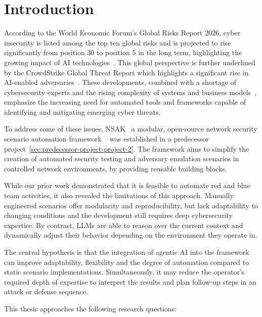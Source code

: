 
\chapter{Introduction}\label{ch:introduction}

According to the World Economic Forum's Global Risks Report 2026,
cyber insecurity is listed among the top ten global risks and is projected to rise significantly from position 30 to position 5 in the long term,
highlighting the growing impact of \gls{AI} technologies~\cite{WEF2025GlobalRisks}.
This global perspective is further underlined by the CrowdStrike Global Threat Report which highlights a significant rise in \gls{AI}-enabled adversaries~\cite{CrowdStrike2025Report}.
These developments, combined with a shortage of cybersecurity experts and the rising complexity of systems and business models~\cite{Figueredo2024RCVaR},
emphasize the increasing need for automated tools and frameworks capable of identifying and mitigating emerging cyber threats.

To address some of these issues, \gls{NSAK}
\textthreequartersemdash~a modular, open-source network security scenario automation framework \textthreequartersemdash~
was established in a predecessor project~\ref{sec:predecessor-project-project-2}.
The framework aims to simplify the creation of automated security testing and
adversary emulation scenarios in controlled network environments, by providing reusable building blocks.

While our prior work demonstrated that it is feasible to automate red and blue team activities,
it also revealed the limitations of this approach.
Manually engineered scenarios offer modularity and reproducibility,
but lack adaptability to changing conditions and the development still requires deep cybersecurity expertise.
By contrast, \glspl{LLM} are able to reason over the current context and dynamically adjust their behavior depending on the environment they operate in.

The central hypothesis is that the integration of agentic \gls{AI} into the framework
can improve adaptability, flexibility and the degree of automation compared to static scenario implementations.
Simultaneously, it may reduce the operator's required depth of expertise to interpret the results and
plan follow-up steps in an attack or defense sequence.

This thesis approaches the following research questions:

